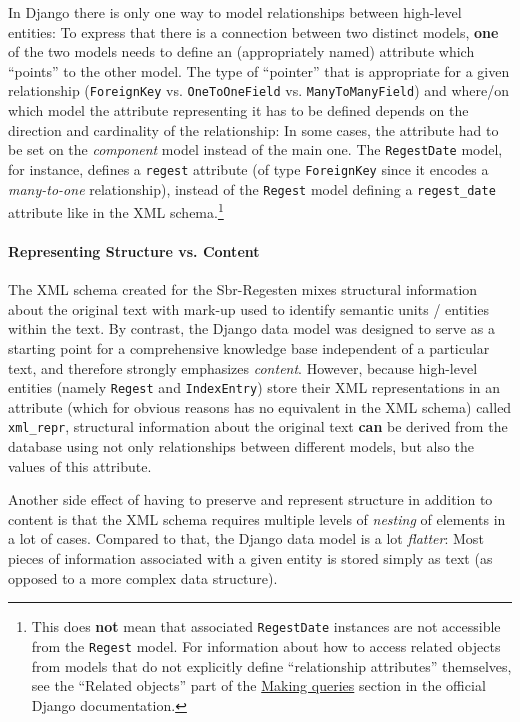 In Django there is only one way to model relationships between
high-level entities: To express that there is a connection between two
distinct models, \textbf{one} of the two models needs to define an
(appropriately named) attribute which ``points'' to the other model.
The type of ``pointer'' that is appropriate for a given relationship
(\texttt{ForeignKey} vs. \texttt{OneToOneField} vs.
\texttt{ManyToManyField}) and where/on which model the attribute
representing it has to be defined depends on the direction and
cardinality of the relationship: In some cases, the attribute had to
be set on the \emph{component} model instead of the main one. The
\texttt{RegestDate} model, for instance, defines a \texttt{regest}
attribute (of type \texttt{ForeignKey} since it encodes a
\emph{many-to-one} relationship), instead of the \texttt{Regest} model
defining a \texttt{regest\_date} attribute like in the XML
schema.\footnote{This does \textbf{not} mean that associated
  \texttt{RegestDate} instances are not accessible from the
  \texttt{Regest} model. For information about how to access related
  objects from models that do not explicitly define ``relationship
  attributes'' themselves, see the ``Related objects'' part of the
  \href{https://docs.djangoproject.com/en/1.4/topics/db/queries/}{Making
    queries} section in the official Django documentation.}

\paragraph{Representing Structure vs. Content}

The XML schema created for the Sbr-Regesten mixes structural
information about the original text with mark-up used to identify
semantic units / entities within the text. By contrast, the Django
data model was designed to serve as a starting point for a
comprehensive knowledge base independent of a particular text, and
therefore strongly emphasizes \emph{content}. However, because
high-level entities (namely \texttt{Regest} and \texttt{IndexEntry})
store their XML representations in an attribute (which for obvious
reasons has no equivalent in the XML schema) called \texttt{xml\_repr},
structural information about the original text \textbf{can} be derived
from the database using not only relationships between different
models, but also the values of this attribute.

Another side effect of having to preserve and represent structure in
addition to content is that the XML schema requires multiple levels of
\emph{nesting} of elements in a lot of cases. Compared to that, the
Django data model is a lot \emph{flatter}: Most pieces of information
associated with a given entity is stored simply as text (as opposed to
a more complex data structure).

